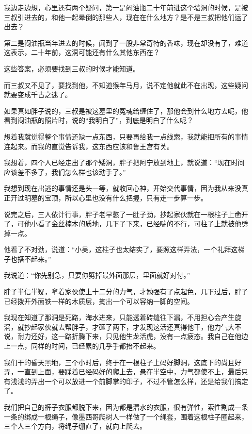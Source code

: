 我边走边想，心里还有两个疑问，第一是闷油瓶二十年前进这个墙洞的时候，是被三叔引进去的，和他一起晕倒的那些人，现在在什么地方？是不是三叔把他们运了出去？

第二是闷油瓶当年进去的时候，闻到了一股非常奇特的香味，现在却没有了，难道这表示，二十年前，这洞可能还有什么其他东西在？

这些答案，必须要找到三叔的时候才能知道。

而三叔又不见了，要找到他，不知道猴年马月，说不定他就此不在出现，这些疑问就要变成千古之迷了。

如果真如胖子说的，三叔是被这墓里的冤魂给缠住了，那他会到什么地方去呢，他看到闷油瓶的照片时，说的“我明白了”，到底是明白了什么呢？

想着我就觉得整个事情还缺一点东西，只要再给我一点线索，我就能把所有的事情连起来。而我的直觉告诉我，这东西应该和鲁王宫有关。

我想着，四个人已经走出了那个矮洞，胖子把阿宁放到地上，就说道：“现在时间应该差不多了，我们怎么样也该动手了。”

我想到现在出逃的事情还是头一等，就收回心神，开始交代事情，因为我从来没真正开过明墓的宝顶，所以心里也没有什么把握，只有走一步算一步。

说完之后，三人依计行事，胖子老早憋了一肚子劲，抄起家伙就在一根柱子上凿开了，可他小看了金丝楠木的质地，几下子下来，已经喘的不行，可柱子上就被他劈掉一点。

他看了不对劲，说道：“小吴，这柱子也太结实了，要照这样弄法，一个礼拜这梯子也搭不起来。”

我说道：“你先别急，只要你劈掉最外面那层，里面就好对付。”

胖子半信半疑，拿着家伙使上十二分的力气，才勉强有了点起色，几下过后，胖子已经拨开外面铁一样的木质层，掏出一个可以容纳一脚的空间。

我现在知道了那洞是死路，海水进来，只能透着砖缝往下漏，不用担心会产生旋涡，就抄起家伙就去帮胖子，才砸了两下，才发现这活还真得他干，他力气大不说，耐力还好，这一路折腾下来，只见他生龙活虎，没有一点疲态。我自己在他边上一点，同样的时间，已经累的几乎手都抬不起来。

我们干的昏天黑地，三个小时后，终于在一根柱子上码好脚洞，这底下的尚且好弄，一直到上面，要踩着已经码好的爬上去，悬在半空中，力气都使不上，最后只有浅浅的弄出一个可以放进一个前脚掌的印子，不过不管怎么样，还是给我们搞定了。

我们把自己的裤子衣服都脱下来，因为都是潜水的衣服，很有弹性，索性割成一条一条的绑成一根绳子，像墨西哥爬树人一样做了一个绳套，围着这根柱子圈起来，三个人三个方向，将绳子绷直了，就向上爬去。

